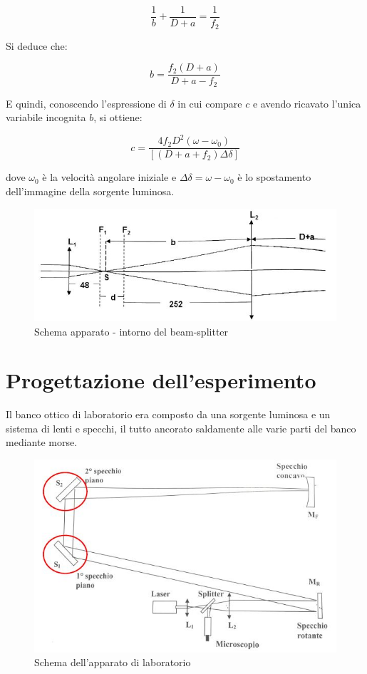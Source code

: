 \documentclass{article}
\begin{document}
\[\frac{1}{b}+\frac{1}{D+a}=\frac{1}{f_2}\]

Si deduce che:

\[b=\frac{f_2(D+a)}{D+a-f_2}\]

E quindi, conoscendo l'espressione di $\delta$ in cui compare $c$ e avendo ricavato l'unica variabile incognita $b$, si ottiene:

\[c= \frac{4f_2D^2(\omega-\omega_0)}{[(D+a+f_2)\Delta\delta]}\]

dove $\omega_0$ è la velocità angolare iniziale e $\Delta\delta = \omega - \omega_0$ è lo spostamento dell'immagine della sorgente luminosa.


\begin{figure}[h]
    \centering
        \includegraphics[width=\linewidth]{IntroTeorica1.JPG}
    \caption{Schema apparato - intorno del beam-splitter}
\end{figure}

\section{Progettazione dell'esperimento}
Il banco ottico di laboratorio era composto da una sorgente luminosa e un sistema di lenti e specchi, il tutto ancorato saldamente alle varie parti del banco mediante morse.

\begin{figure}[h] %
    \centering
    \includegraphics[width=0.6\linewidth]{Progettazione1.JPG}
    \caption{Schema dell'apparato di laboratorio}
    \label{schema_apparato}
\end{figure}
\end{document}
